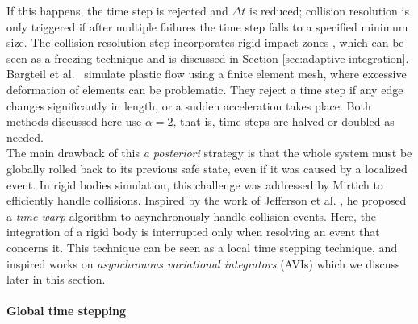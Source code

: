 If this happens, the time step is rejected and $\Delta t$ is reduced; collision resolution is only triggered if after multiple failures the time step falls to a specified minimum size.
The collision resolution step incorporates rigid impact zones \cite{Provot1997}, which can be seen as a freezing technique and is discussed in Section \ref{sec:adaptive-integration}.
Bargteil et al.~\cite{Bargteil2007} simulate plastic flow using a finite element mesh, where excessive deformation of elements can be problematic.
They reject a time step if any edge changes significantly in length, or a sudden acceleration takes place.
Both methods discussed here use $\alpha=2$, that is, time steps are halved or doubled as needed.
\\
The main drawback of this \textit{a posteriori} strategy is that the whole system must be globally rolled back to its previous safe state, even if it was caused by a localized event.
In rigid bodies simulation, this challenge was addressed by Mirtich \cite{Mirtich2000} to efficiently handle collisions.
Inspired by the work of Jefferson et al. \cite{Jefferson1985}, he proposed a \emph{time warp} algorithm to asynchronously handle collision events.
Here, the integration of a rigid body is interrupted only when resolving an event that concerns it.
This technique can be seen as a local time stepping technique, and inspired works on \emph{asynchronous variational integrators} (AVIs) which we discuss later in this section.

\paragraph*{Global time stepping}

